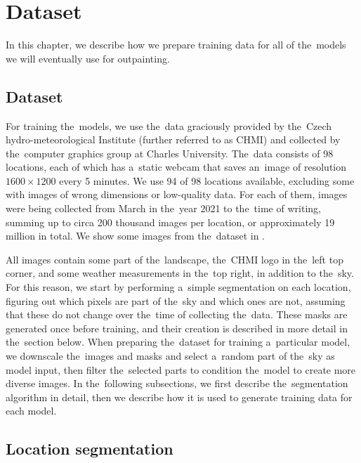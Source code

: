 \chapter{Dataset} \label{dataset}


In this chapter, we describe how we prepare training data for all of the~models we will eventually use for outpainting.


\section{Dataset}

For training the~models, we use the~data graciously provided by the~Czech hydro-meteorological Institute (further referred to as CHMI) \citep{chmi_cz_web} and collected by the~computer graphics group \citep{computer_graphics_group_web} at Charles University. The~data consists of 98 locations, each of which has a~static webcam that saves an~image of resolution $1600 \times 1200$ every 5 minutes. We use 94 of 98 locations available, excluding some with images of wrong dimensions or low-quality data. For each of them, images were being collected from March in the~year 2021 to the~time of writing, summing up to circa 200 thousand images per location, or approximately 19 million in total. We show some images from the~dataset in .



All images contain some part of the~landscape, the~CHMI logo in the~left top corner, and some weather measurements in the~top right, in addition to the~sky. For this reason, we start by performing a~simple segmentation on each location, figuring out which pixels are part of the~sky and which ones are not, assuming that these do not change over the~time of collecting the~data. These masks are generated once before training, and their creation is described in more detail in the~section below. When preparing the~dataset for training a~particular model, we downscale the~images and masks and select a~random part of the~sky as model input, then filter the~selected parts to condition the~model to create more diverse images. In the~following subsections, we first describe the~segmentation algorithm in detail, then we describe how it is used to generate training data for each model.


\section{Location segmentation}

